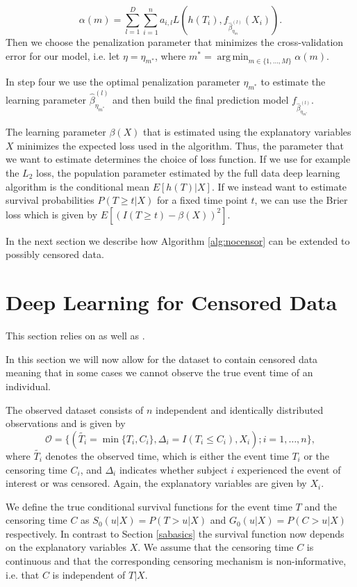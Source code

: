 \documentclass[12pt, a4paper]{scrartcl}
\theoremstyle{definition}
\theoremstyle{plain}
\numberwithin{equation}{section}
\numberwithin{figure}{section}
\numberwithin{table}{section}
\DeclareMathOperator*{\argmin}{arg\,min}
\begin{document}
	\begin{equation*}
	 \alpha(m) = \sum_{l=1}^D \sum_{i=1}^n a_{i,l} L(h(T_i), f_{\hat{\beta}_{\eta_m}^{(l)}}(X_i)).
 	\end{equation*}
 	Then we choose the penalization parameter that minimizes the cross-validation error for our model, i.e. let $\eta = \eta_{m^*}$, where $m^* = \argmin_{m \in \{1,\dots,M\}} \alpha(m)$.
 	
 	In step four we use the optimal penalization parameter $\eta_{m^*}$ to estimate the learning parameter $\hat{\beta}_{\eta_{m^*}}^{(l)}$ and then build the final prediction model $f_{\hat{\beta}_{\eta_{m^*}}^{(l)}}$.
 	
 	The learning parameter $\beta(X)$ that is estimated using the explanatory variables $X$ minimizes the expected loss used in the algorithm.
 	Thus, the parameter that we want to estimate determines the choice of loss function.
 	If we use for example the $L_2$ loss, the population parameter estimated by the full data deep learning algorithm is the conditional mean $E[h(T) \vert X]$.
 	If we instead want to estimate survival probabilities $P(T\geq t \vert X )$ for a fixed time point $t$, we can use the Brier loss which is given by $E[(I(T\geq t)-\beta(X))^2]$.
 	
 	In the next section we describe how Algorithm \ref{alg:nocensor} can be extended to possibly censored data.
 	
	\newpage
	\section{Deep Learning for Censored Data} \label{censored}
	
	This section relies on \citet*{basearticle} as well as \citet*{deeplbook}.
	
	In this section we will now allow for the dataset to contain censored data meaning that in some cases we cannot observe the true event time of an individual.
	
	The observed dataset consists of $n$ independent and identically distributed observations and is given by
	$$\mathcal{O} = \{(\tilde{T_i} = \min \{T_i, C_i\}, \Delta_i = I(T_i \leq C_i), X_i); i = 1,\dots,n\},$$
	 where $\tilde{T_i}$ denotes the observed time, which is either the event time $T_i$ or the censoring time $C_i$, and $\Delta_i$ indicates whether subject $i$ experienced the event of interest or was censored.
	 Again, the explanatory variables are given by $X_i$.
	 
	 We define the true conditional survival functions for the event time $T$ and the censoring time $C$ as $S_0(u \vert X)=P(T>u \vert X)$ and $G_0(u \vert X)=P(C>u \vert X)$ respectively.
	 In contrast to Section \ref{sabasics} the survival function now depends on the explanatory variables $X$.
	 We assume that the censoring time $C$ is continuous and that the corresponding censoring mechanism is non-informative, i.e. that $C$ is independent of $T\vert X$.
	 
\end{document}
